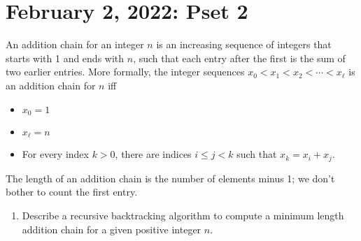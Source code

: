 \section{February 2, 2022: Pset 2} 
\begin{prob}
    An addition chain for an integer $n$ is an increasing sequence of integers that starts with 1 and ends with $n$, such that each entry after the first is the sum of two earlier entries. More formally, the integer sequences $x_0 < x_1 < x_2 < \cdots <x_{\ell}$ is an addition chain for $n$ iff 
    \begin{itemize}
    \setlength\itemsep{-.2em}
        \item $x_0=1$ 
        \item $x_{\ell}=n$ 
        \item For every index $k>0$, there are indices $i \leq j < k$ such that $x_k=x_i +x_j $.
    \end{itemize}
    The length of an addition chain is the number of elements minus 1; we don't bother to count the first entry. 
    \begin{enumerate}[label=(\alph*)]
    \setlength\itemsep{-.2em}
        \item   Describe a recursive backtracking algorithm to compute a minimum length addition chain for a given positive integer $n$.
    \end{enumerate}
\end{prob}
